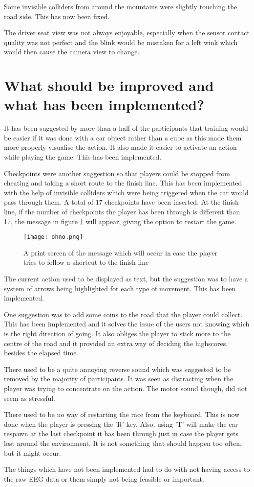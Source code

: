 Some invisible colliders from around the mountains were slightly touching the road side. This has now been fixed.

The driver seat view was not always enjoyable, especially when the sensor contact quality was not perfect and the blink would be mistaken for a left wink which would then cause the camera view to change.

\section{What should be improved and what has been implemented?}
\label{section:implemented}
It has been suggested by more than a half of the participants that training would be easier if it was done with a car object rather than a cube as this made them more properly visualise the action. It also made it easier to activate an action while playing the game. This has been implemented.

Checkpoints were another suggestion so that players could be stopped from cheating and taking a short route to the finish line. This has been implemented with the help of invisible colliders which were being triggered when the car would pass through them. A total of 17 checkpoints have been inserted. At the finish line, if the number of checkpoints the player has been through is different than 17, the message in figure \ref{fig:ohno} will appear, giving the option to restart the game.

\begin{figure}
  \centering
  \texttt{[image: ohno.png]}
  \caption{A print screen of the message which will occur in case the player tries to follow a shortcut to the finish line}
    \label{fig:ohno}        
\end{figure}

The current action used to be displayed as text, but the suggestion was to have a system of arrows being highlighted for each type of movement. This has been implemented.

One suggestion was to add some coins to the road that the player could collect. This has been implemented and it solves the issue of the users not knowing which is the right direction of going. It also obliges the player to stick more to the centre of the road and it provided an extra way of deciding the highscores, besides the elapsed time.  

There used to be a quite annoying reverse sound which was suggested to be removed by the majority of participants. It was seen as distracting when the player was trying to concentrate on the action. The motor sound though, did not seem as stressful.

There used to be no way of restarting the race from the keyboard. This is now done when the player is pressing the 'R' key. Also, using 'T' will make the car respawn at the last checkpoint it has been through just in case the player gets lost around the environment. It is not something that should happen too often, but it might occur.

The things which have not been implemented had to do with not having access to the raw EEG data or them simply not being feasible or important.